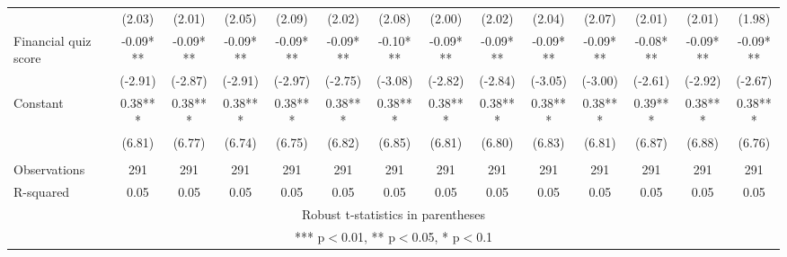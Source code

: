 \documentclass[]{article}
\begin{document}
\begin{tabular}{lccccccccccccc}
 & (2.03) & (2.01) & (2.05) & (2.09) & (2.02) & (2.08) & (2.00) & (2.02) & (2.04) & (2.07) & (2.01) & (2.01) & (1.98) \\
Financial quiz score & -0.09*** & -0.09*** & -0.09*** & -0.09*** & -0.09*** & -0.10*** & -0.09*** & -0.09*** & -0.09*** & -0.09*** & -0.08*** & -0.09*** & -0.09*** \\
 & (-2.91) & (-2.87) & (-2.91) & (-2.97) & (-2.75) & (-3.08) & (-2.82) & (-2.84) & (-3.05) & (-3.00) & (-2.61) & (-2.92) & (-2.67) \\
Constant & 0.38*** & 0.38*** & 0.38*** & 0.38*** & 0.38*** & 0.38*** & 0.38*** & 0.38*** & 0.38*** & 0.38*** & 0.39*** & 0.38*** & 0.38*** \\
 & (6.81) & (6.77) & (6.74) & (6.75) & (6.82) & (6.85) & (6.81) & (6.80) & (6.83) & (6.81) & (6.87) & (6.88) & (6.76) \\
 &  &  &  &  &  &  &  &  &  &  &  &  &  \\
Observations & 291 & 291 & 291 & 291 & 291 & 291 & 291 & 291 & 291 & 291 & 291 & 291 & 291 \\
 R-squared & 0.05 & 0.05 & 0.05 & 0.05 & 0.05 & 0.05 & 0.05 & 0.05 & 0.05 & 0.05 & 0.05 & 0.05 & 0.05 \\ \hline
\multicolumn{14}{c}{ Robust t-statistics in parentheses} \\
\multicolumn{14}{c}{ *** p$<$0.01, ** p$<$0.05, * p$<$0.1} \\
\end{tabular}
\end{document}
